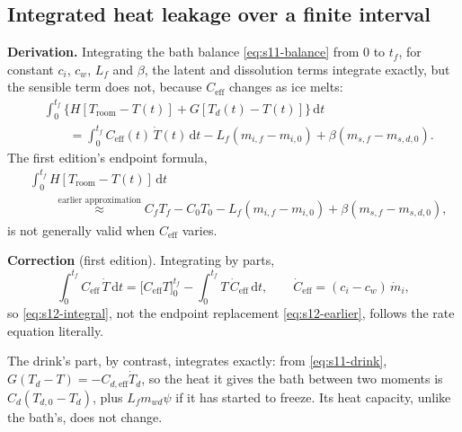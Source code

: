 \documentclass[11pt,a4paper]{article}
\newcommand{\dd}{\mathrm{d}}
\newcommand{\Troom}{T_{\mathrm{room}}}
\newcommand{\Ceff}{C_{\mathrm{eff}}}
\newcommand{\Cdeff}{C_{d,\mathrm{eff}}}
\newcommand{\para}[1]{\par\smallskip\noindent\textbf{#1}\enspace}
\begin{document}
\subsection{Integrated heat leakage over a finite interval}
\para{Derivation.} Integrating the bath balance \eqref{eq:s11-balance} from $0$ to $t_f$, for constant
$c_i$, $c_w$, $L_f$ and $\beta$, the latent and dissolution terms integrate exactly, but the sensible term does
not, because $\Ceff$ changes as ice melts:
\begin{equation}
\begin{split}
&\int_0^{t_f}\big\{H[\Troom - T(t)] + G[T_d(t) - T(t)]\big\}\,\dd t\\
&\qquad= \int_0^{t_f}\Ceff(t)\,\dot T(t)\,\dd t - L_f(m_{i,f} - m_{i,0}) + \beta(m_{s,f} - m_{s,d,0}) .
\end{split}
\label{eq:s12-integral}
\end{equation}
The first edition's endpoint formula,
\begin{equation}
\begin{split}
&\int_0^{t_f} H[\Troom - T(t)]\,\dd t\\
&\qquad\overset{\text{earlier approximation}}{\approx} C_fT_f - C_0T_0 - L_f(m_{i,f} - m_{i,0}) + \beta(m_{s,f} - m_{s,d,0}),
\end{split}
\label{eq:s12-earlier}
\end{equation}
is not generally valid when $\Ceff$ varies.

\begin{correction}
\textbf{Correction} (first edition). Integrating by parts,
\begin{equation}
\int_0^{t_f}\Ceff\,\dot T\,\dd t = \big[\Ceff T\big]_0^{t_f} - \int_0^{t_f} T\,\dot C_{\mathrm{eff}}\,\dd t,\qquad
\dot C_{\mathrm{eff}} = (c_i - c_w)\,\dot m_i , \label{eq:s12-parts}
\end{equation}
so \eqref{eq:s12-integral}, not the endpoint replacement \eqref{eq:s12-earlier}, follows the rate equation
literally.
\end{correction}
The drink's part, by contrast, integrates exactly: from \eqref{eq:s11-drink}, $G(T_d - T) = -\Cdeff\dot T_d$,
so the heat it gives the bath between two moments is $C_d(T_{d,0} - T_d)$, plus $L_fm_{wd}\psi$ if it has
started to freeze. Its heat capacity, unlike the bath's, does not change.
\end{document}
